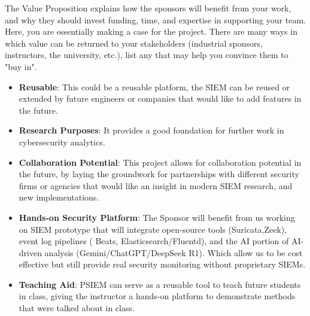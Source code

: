 The Value Proposition explains how the sponsors will benefit from your work, and why they should invest funding, time, and expertise in supporting your team. Here, you are essentially making a case for the project. There are many ways in which value can be returned to your stakeholders (industrial sponsors, instructors, the university, etc.), list any that may help you convince them to "buy in".

\begin{itemize}

\item \textbf{Reusable}: This could be a reusable platform, the SIEM can be reused or extended by future engineers or companies that would like to add features in the future.

\item \textbf{Research Purposes}: It provides a good foundation for further work in cybersecurity analytics.

\item \textbf{Collaboration Potential}: This project allows for collaboration potential in the future, by laying the groundwork for partnerships with different security firms or agencies that would like an insight in modern SIEM research, and new implementations.

\item \textbf{Hands-on Security Platform}: The Sponsor will benefit from us working on SIEM prototype that will integrate open-source tools (Suricata,Zeek), event log pipelines ( Beats, Elasticsearch/Fluentd), and the AI portion of AI-driven analysis 
(Gemini/ChatGPT/DeepSeek R1). Which allow us to be cost effective but still provide real security monitoring without proprietary SIEMs.

\item \textbf{Teaching Aid}: PSIEM can serve as a reusable tool to teach future students in class, giving the instructor a hands-on platform to demonstrate methods that were talked about in class. 

\end{itemize}